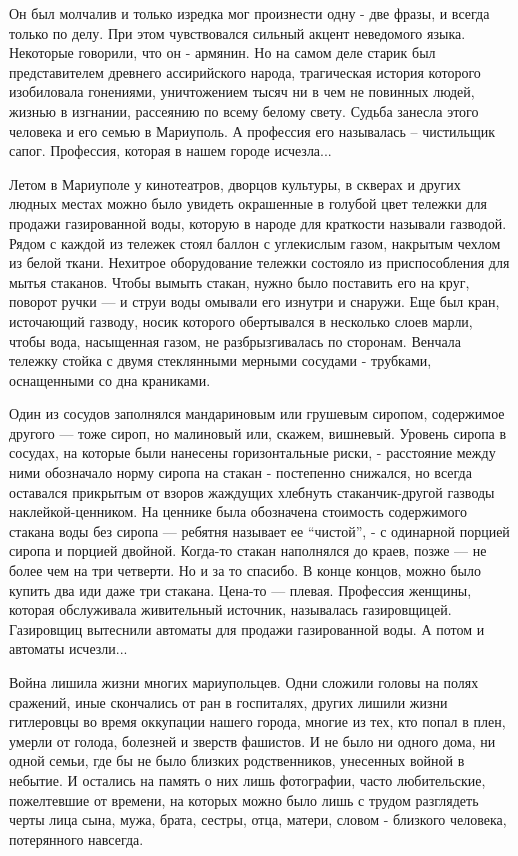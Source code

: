 Он был молчалив и только изредка мог произнести одну - две фразы, и всегда
только по делу. При этом чувствовался сильный акцент неведомого языка.
Некоторые говорили, что он - армянин. Но на самом деле старик был
представителем древнего ассирийского народа, трагическая история которого
изобиловала гонениями, уничтожением тысяч ни в чем не повинных людей, жизнью в
изгнании, рассеянию по всему белому свету. Судьба занесла этого человека и его
семью в Мариуполь. А профессия его называлась – чистильщик сапог. Профессия,
которая в нашем городе исчезла...

Летом в Мариуполе у кинотеатров, дворцов культуры, в скверах и других людных
местах можно было увидеть окрашенные в голубой цвет тележки для продажи
газированной воды, которую в народе для краткости называли газводой. Рядом с
каждой из тележек стоял баллон с углекислым газом, накрытым чехлом из белой
ткани. Нехитрое оборудование тележки состояло из приспособления для мытья
стаканов. Чтобы вымыть стакан, нужно было поставить его на круг, поворот ручки
— и струи воды омывали его изнутри и снаружи. Еще был кран, источающий газводу,
носик которого обертывался в несколько слоев марли, чтобы вода, насыщенная
газом, не разбрызгивалась по сторонам. Венчала тележку стойка с двумя
стеклянными мерными сосудами - трубками, оснащенными со дна краниками.

Один из сосудов заполнялся мандариновым или грушевым сиропом, содержимое
другого — тоже сироп, но малиновый или, скажем, вишневый. Уровень сиропа в
сосудах, на которые были нанесены горизонтальные риски, - расстояние между ними
обозначало норму сиропа на стакан - постепенно снижался, но всегда оставался
прикрытым от взоров жаждущих хлебнуть стаканчик-другой газводы
наклейкой-ценником. На ценнике была обозначена стоимость содержимого стакана
воды без сиропа — ребятня называет ее \enquote{чистой}, - с одинарной порцией сиропа и
порцией двойной. Когда-то стакан наполнялся до краев, позже — не более чем на
три четверти. Но и за то спасибо. В конце концов, можно было купить два иди
даже три стакана. Цена-то — плевая. Профессия женщины, которая обслуживала
живительный источник, называлась газировщицей. Газировщиц вытеснили автоматы
для продажи газированной воды. А потом и автоматы исчезли...

Война лишила жизни многих мариупольцев. Одни сложили головы на полях сражений,
иные скончались от ран в госпиталях, других лишили жизни гитлеровцы во время
оккупации нашего города, многие из тех, кто попал в плен, умерли от голода,
болезней и зверств фашистов. И не было ни одного дома, ни одной семьи, где бы
не было близких родственников, унесенных войной в небытие. И остались на память
о них лишь фотографии, часто любительские, пожелтевшие от времени, на которых
можно было лишь с трудом разглядеть черты лица сына, мужа, брата, сестры, отца,
матери, словом - близкого человека, потерянного навсегда.

